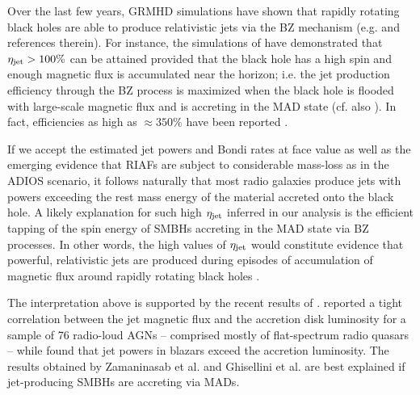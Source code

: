 \documentclass[useAMS,usenatbib]{mn2e}
\begin{document}
Over the last few years, GRMHD simulations have shown that rapidly rotating black holes are able to produce relativistic jets via the BZ mechanism (e.g. \citealt{Komissarov01,Koide02, De-Villiers03, McKinney04,McKinney05,Hawley06,Sasha10,Sasha11,Sasha12rev,Fragile12jet} and references therein). For instance, the simulations of \cite{Sasha11,Sasha12,McKinney12} have demonstrated that $\eta_{\rm jet}>100\%$ can be attained provided that the black hole has a high spin and enough magnetic flux is accumulated near the horizon; i.e. the jet production efficiency through the BZ process is maximized when the black hole is flooded with large-scale magnetic flux and is accreting in the MAD state (cf. also \citealt{Semenov04}). In fact, efficiencies as high as $\approx 350\%$ have been reported \citep{McKinney12,Sasha12rev}. 

If we accept the estimated jet powers and Bondi rates at face value as well as the emerging evidence that RIAFs are subject to considerable mass-loss as in the ADIOS scenario, it follows naturally that most radio galaxies produce jets with powers exceeding the rest mass energy of the material accreted onto the black hole. A likely explanation for such high $\eta_{\rm jet}$ inferred in our analysis is the efficient tapping of the spin energy of SMBHs accreting in the MAD state via BZ processes. In other words, the high values of $\eta_{\rm jet}$ would constitute evidence that powerful, relativistic jets are produced during episodes of accumulation of magnetic flux around rapidly rotating black holes \citep{Sikora13}. 

The interpretation above is supported by the recent results of \cite{Zamaninasab14,Ghisellini14}. \cite{Zamaninasab14} reported a tight correlation between the jet magnetic flux and the accretion disk luminosity for a sample of 76 radio-loud AGNs -- comprised mostly of flat-spectrum radio quasars -- while \cite{Ghisellini14} found that jet powers in blazars exceed the accretion luminosity. The results obtained by Zamaninasab et al. and Ghisellini et al. are best explained if jet-producing SMBHs are accreting via MADs.
\end{document}
